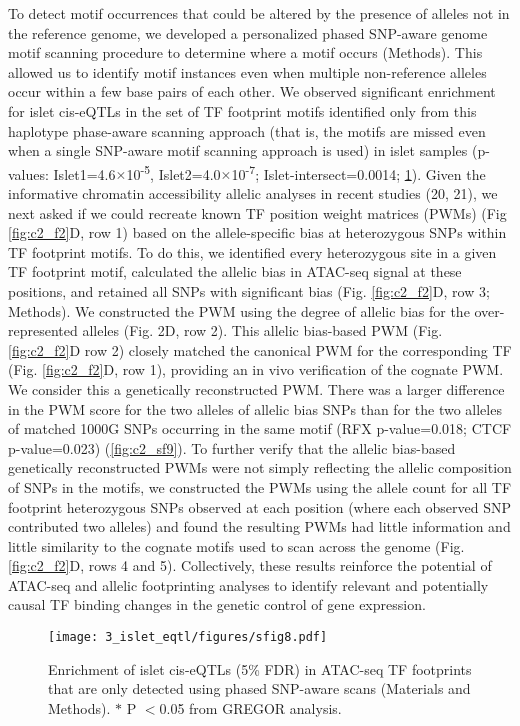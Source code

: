 To detect motif occurrences that could be altered by the presence of alleles not in the reference genome, we developed a personalized phased SNP-aware genome motif scanning procedure to determine where a motif occurs (Methods). This allowed us to identify motif instances even when multiple non-reference alleles occur within a few base pairs of each other. We observed significant enrichment for islet cis-eQTLs in the set of TF footprint motifs identified only from this haplotype phase-aware scanning approach (that is, the motifs are missed even when a single SNP-aware motif scanning approach is used) in islet samples (p-values: Islet1=4.6$\times$10\textsuperscript{-5}, Islet2=4.0$\times$10\textsuperscript{-7}; Islet-intersect=0.0014; \ref{fig:c2_sf8}). Given the informative chromatin accessibility allelic analyses in recent studies (20, 21), we next asked if we could recreate known TF position weight matrices (PWMs) (Fig \ref{fig:c2_f2}D, row 1) based on the allele-specific bias at heterozygous SNPs within TF footprint motifs. To do this, we identified every heterozygous site in a given TF footprint motif, calculated the allelic bias in ATAC-seq signal at these positions, and retained all SNPs with significant bias (Fig. \ref{fig:c2_f2}D, row 3; Methods). We constructed the PWM using the degree of allelic bias for the over-represented alleles (Fig. 2D, row 2). This allelic bias-based PWM (Fig. \ref{fig:c2_f2}D row 2) closely matched the canonical PWM for the corresponding TF (Fig. \ref{fig:c2_f2}D, row 1), providing an in vivo verification of the cognate PWM. We consider this a genetically reconstructed PWM. There was a larger difference in the PWM score for the two alleles of allelic bias SNPs than for the two alleles of matched 1000G SNPs occurring in the same motif (RFX p-value=0.018; CTCF p-value=0.023) (\ref{fig:c2_sf9}). To further verify that the allelic bias-based genetically reconstructed PWMs were not simply reflecting the allelic composition of SNPs in the motifs, we constructed the PWMs using the allele count for all TF footprint heterozygous SNPs observed at each position (where each observed SNP contributed two alleles) and found the resulting PWMs had little information and little similarity to the cognate motifs used to scan across the genome (Fig. \ref{fig:c2_f2}D, rows 4 and 5). Collectively, these results reinforce the potential of ATAC-seq and allelic footprinting analyses to identify relevant and potentially causal TF binding changes in the genetic control of gene expression.

\begin{figure}
    \centering
    \texttt{[image: 3\_islet\_eqtl/figures/sfig8.pdf]}
    \caption{Enrichment of islet cis-eQTLs (5\% FDR) in ATAC-seq TF footprints that are only detected using phased SNP-aware scans (Materials and Methods). $\ast$ P $<$0.05 from GREGOR analysis.}
    \label{fig:c2_sf8}
\end{figure}

